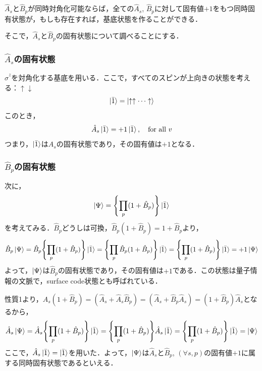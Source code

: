 \documentclass[dvipdfmx,autodetect-engine]{jsarticle}
\begin{document}
$\hat{A}_s$と$\hat{B}_p$が同時対角化可能ならば，全ての$\hat{A}_s$, $\hat{B}_p$に対して固有値$+1$をもつ同時固有状態が，もしも存在すれば，基底状態を作ることができる．

そこで，$\hat{A}_s$と$\hat{B}_p$の固有状態について調べることにする．
\subsubsection{$\hat{A}_s$の固有状態}
$\hat{\sigma}^{z}$を対角化する基底を用いる．ここで，すべてのスピンが上向きの状態を考える：$\uparrow \downarrow$
\begin{equation}
    \ket{\bar{1}} = \ket{\uparrow\uparrow\cdots\uparrow}
\end{equation}
このとき，
\begin{equation}
    \hat{A}_s \ket{\bar{1}} = +1\ket{\bar{1}},\ \ \ \text{for all}\  v
\end{equation}
つまり，$\ket{\bar{1}}$は$\hat{A}_s$の固有状態であり，その固有値は$+1$となる．


\subsubsection{$\hat{B}_p$の固有状態}
次に，
\begin{equation}
    \ket{\Psi} 
    = \Biggl\{
    \prod_{p}(1 + \hat{B}_p)
    \Biggr\}\ket{\bar{1}}
\end{equation}
を考えてみる．$\hat{B}_p$どうしは可換，$\hat{B}_p(1 + \hat{B}_p) = 1 + \hat{B}_p$より，
\begin{equation}
    \hat{B}_p\ket{\Psi} 
    = \hat{B}_p\Biggl\{
    \prod_{p}(1 + \hat{B}_p)
    \Biggr\}\ket{\bar{1}}
    = \Biggl\{
    \prod_{p}\hat{B}_p(1 + \hat{B}_p)
    \Biggr\}\ket{\bar{1}}
    = \Biggl\{
    \prod_{p}(1 + \hat{B}_p)
    \Biggr\}\ket{\bar{1}}
    =+1\ket{\Psi}
\end{equation}
よって，$\ket{\Psi}$は$\hat{B}_p$の固有状態であり，その固有値は$+1$である．この状態は量子情報の文脈で，surface code状態とも呼ばれている．

性質1より，$\hat{A}_s (1 + \hat{B}_p) =  (\hat{A}_s + \hat{A}_s\hat{B}_p) = (\hat{A}_s + \hat{B}_p \hat{A}_s) = (1 + \hat{B}_p )\hat{A}_s$となるから，
\begin{equation}
    \hat{A}_s \ket{\Psi} 
    =  \hat{A}_s\Biggl\{
    \prod_{p}(1 + \hat{B}_p)
    \Biggr\}\ket{\bar{1}}
    =  \Biggl\{
    \prod_{p}(1 + \hat{B}_p)
    \Biggr\}\hat{A}_s\ket{\bar{1}}
    =\Biggl\{
    \prod_{p}(1 + \hat{B}_p)
    \Biggr\}\ket{\bar{1}}
    =\ket{\Psi}
\end{equation}
ここで，$\hat{A}_s\ket{\bar{1}} = \ket{\bar{1}}$を用いた．よって，$\ket{\Psi}$は$\hat{A}_s$と$\hat{B}_p$, $(\forall s, p)$の固有値$+1$に属する同時固有状態であるといえる．
\end{document}

